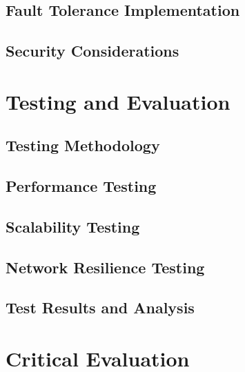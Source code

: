 \documentclass[12pt,a4paper]{report}
\begin{document}
\section{Fault Tolerance Implementation}

\section{Security Considerations}

\chapter{Testing and Evaluation}
\section{Testing Methodology}

\section{Performance Testing}

\section{Scalability Testing}

\section{Network Resilience Testing}

\section{Test Results and Analysis}

\chapter{Critical Evaluation}
\end{document}
